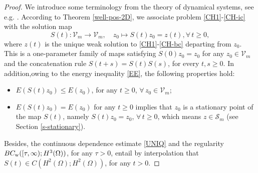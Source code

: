 \documentclass[11pt,reqno]{amsart}
\theoremstyle{remark}
\numberwithin{equation}{section}
\begin{document}
\begin{proof}
We introduce some terminology from the theory of dynamical systems, see e.g. \cite[Chapter 9]{CH1998}. According to Theorem \ref{well-pos-2D}, we associate problem \eqref{CH1}-\eqref{CH-ic} with the solution map
$$S(t):\mathcal{V}_m\to \mathcal{V}_m, 
\quad
z_0 \mapsto S(t)z_0= z(t), \forall \, t \geq 0,
$$
where $z(t) $ is the unique weak solution to \eqref{CH1}-\eqref{CH-bc} departing from $z_0$. This is a one-parameter family of maps satisfying $S(0)z_0=z_0$ for any $z_0 \in \mathcal{V}_m$ and the concatenation rule
$S(t+s)=S(t)S(s)$, for every $t,s \geq 0$.
In addition,owing to the energy inequality \eqref{EE}, the following properties hold:
\begin{itemize}
\item[(i)] $E(S(t)z_0)\leq E(z_0)$, for any $t\geq 0$, $\forall\, z_0\in \mathcal{V}_m$;
\smallskip

\item[(ii)] $E(S(t)z_0)=E(z_0)$ for any $t\geq 0$ implies that $z_0$ is a stationary point of the map $S(t)$, namely $S(t)z_0=z_0$, $\forall \,t\geq 0$, which means $z\in \mathcal{S}_m$ (see Section \ref{s-stationary}).
\end{itemize}
Besides, the continuous dependence estimate \eqref{UNIQ} and the regularity $BC_{\rm w}([\tau,\infty); H^3(\Omega))$, for any $\tau>0$, entail by interpolation that $S(t) \in C(H^2(\Omega); H^2(\Omega))$, for any $t >0$. 


\end{proof}
\end{document}
